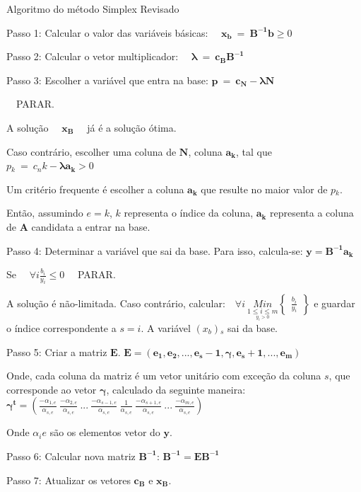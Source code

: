 \begin{algorithm}[H]
\caption{Algoritmo do método Simplex Revisado}

Passo 1: Calcular o valor das variáveis básicas: \ \ $\mathbf{x_{b}}\ =\ \mathbf{B^{-1}b}\geq0$

Passo 2: Calcular o vetor multiplicador: \ \ $\mathbf{\lambda} \ =\ \mathbf{c{_B}B^{-1}}$

Passo 3: Escolher a variável que entra na base: $\mathbf{p}\ =\ \mathbf{c{_N}}-\mathbf{\lambda N}$

 \ \ PARAR.

A solução \ \ $\mathbf{x{_B}}$ \ \ já é a solução ótima. 

Caso contrário, escolher uma coluna de $\mathbf{N}$, coluna $\mathbf{a{_k}}$, tal que $\mathit{p{_k}}\ =\ \mathit{c{_nk}}-\mathbf{\lambda a{_k}}> 0$

Um critério frequente é escolher a coluna $\mathbf{a{_k}}$ que resulte no maior valor de $\mathit{p{_k}}$.

Então, assumindo $\mathit{e} = \mathit{k}$, $\mathit{k}$ representa o índice da coluna, $\mathbf{a{_k}}$ representa a coluna de $\mathbf{A}$ candidata a entrar na base. 

Passo 4: Determinar a variável que sai da base. Para isso, calcula-se: $\mathbf{y}=\mathbf{B^{-1}a{_k}}$

Se \ \ $\forall i\mathit{\frac{b{_i}}{y{_i}}}\leq 0$ \ \ PARAR.

A solução é não-limitada. Caso contrário, calcular:\ \ 
$\forall i\ \underset{\underset{y{_i}>0}{1\leq i\leq m}}{Min}\begin{Bmatrix}
\mathit{\frac{b{_i}}{y{_i}}}
\end{Bmatrix}$ e guardar o índice correspondente a $s = i$. A variável $(x{_b}){_s}$ sai da base.

Passo 5: Criar a matriz $\mathbf{E}$.
$\mathbf{E}=(\mathbf{e{_1}},\mathbf{e{_2}},...,\mathbf{e{_s-1}},\mathbf{\gamma} , \mathbf{e{_s+1}},...,\mathbf{e{_m}})$

Onde, cada coluna da matriz é um vetor unitário com exceção da coluna $\mathit{s}$, que corresponde ao vetor $\mathbf{\gamma}$, calculado da seguinte maneira: \\
$\mathbf{\gamma^{t}}=\left( \mathit{\frac{-\alpha {_{1,e}}}{\alpha {_{s,e}}}}\ \mathit{\frac{-\alpha {_{2,e}}}{\alpha {_{s,e}}}}\ ...\ \mathit{\frac{-\alpha {_{s-1,e}}}{\alpha {_{s,e}}}}\ \mathit{\frac{1}{\alpha {_{s,e}}}\ \frac{-\alpha {_{s+1,e}}}{\alpha {_{s,e}}}}\ ...\ \mathit{\frac{-\alpha {_{m,e}}}{\alpha {_{s,e}}}} \right )$

Onde $\mathit{\alpha{_ie}}$ são os elementos vetor do $\mathbf{y}$.

Passo 6: Calcular nova matriz $\mathbf{B^{-1}}$: $\mathbf{B^{-1}} = \mathbf{EB^{-1}}$

Passo 7: Atualizar os vetores $\mathbf{c{_B}}$ e $\mathbf{x{_B}}$.
\end{algorithm}

